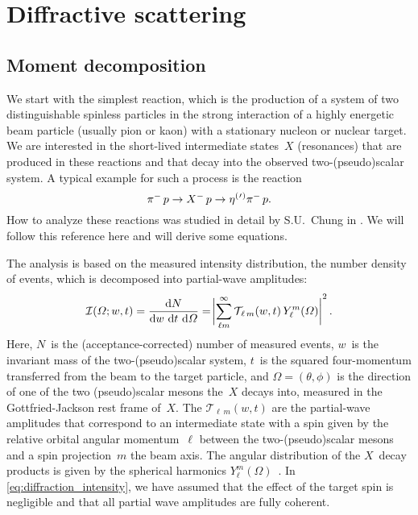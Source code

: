 \section{Diffractive scattering}%
\label{sec:diffraction}

\subsection{Moment decomposition}%
\label{sec:diffraction:moment}

We start with the simplest reaction, which is the production of a
system of two distinguishable spinless particles in the strong
interaction of a highly energetic beam particle (usually pion or kaon)
with a stationary nucleon or nuclear target.  We are interested in the
short-lived intermediate states~$X$ (resonances) that are produced in
these reactions and that decay into the observed two-(pseudo)scalar
system.  A typical example for such a process is the reaction
\begin{equation}
  \pi^-\, p \to X^-\, p \to \etaOrPrPim\, p.
\end{equation}
How to analyze these reactions was studied in detail by S.U.~Chung in
.  We will follow this reference here and will
derive some equations.

The analysis is based on the measured intensity distribution, \ie the
number density of events, which is decomposed into partial-wave
amplitudes:
\begin{equation}
  \label{eq:diffraction_intensity}
  \mathcal{I}(\Omega; w, t)
  = \frac{\dif{N}}{\dif{w}\, \dif{t}\, \dif{\Omega}}
  = \Abs[3]{\sum_{\ell m}^\infty \mathcal{T\!}_{\ell\, m}(w, t)\, Y_\ell^m(\Omega)}^2.
\end{equation}
Here, $N$~is the (acceptance-corrected) number of measured events,
$w$~is the invariant mass of the two-(pseudo)scalar system, $t$~is the
squared four-momentum transferred from the beam to the target
particle, and $\Omega = (\theta, \phi)$ is the direction of one of the
two (pseudo)scalar mesons the~$X$ decays into, measured in the
Gottfried-Jackson rest frame of~$X$.  The $\mathcal{T\!}_{\ell\, m}(w,
t)$ are the partial-wave amplitudes that correspond to an intermediate
state with a spin given by the relative orbital angular
momentum~$\ell$ between the two-(pseudo)scalar mesons and a spin
projection~$m$ \wrt the beam axis.  The angular distribution of the
$X$~decay products is given by the spherical harmonics
$Y_\ell^m(\Omega)$~\cite{wikipedia:sphericalHarm}.  In
\cref{eq:diffraction_intensity}, we have assumed that the effect of
the target spin is negligible and that all partial wave amplitudes are
fully coherent.

